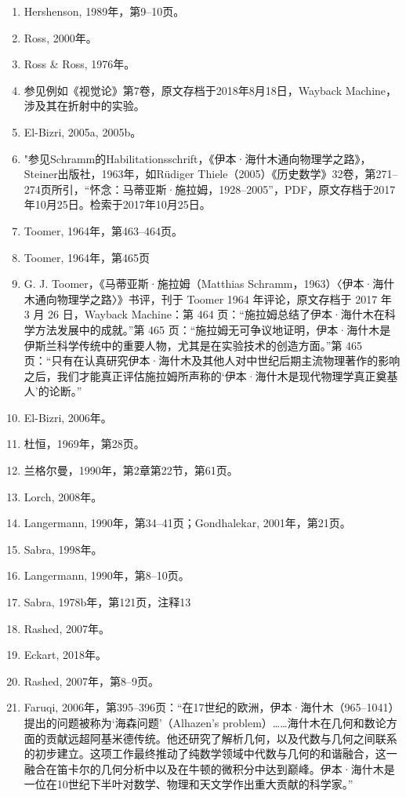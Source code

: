 \begin{enumerate}
\item Hershenson, 1989年，第9–10页。
\item Ross, 2000年。
\item Ross & Ross, 1976年。
\item 参见例如《视觉论》第7卷，原文存档于2018年8月18日，Wayback Machine，涉及其在折射中的实验。
\item El-Bizri, 2005a, 2005b。
\item "参见Schramm的Habilitationsschrift，《伊本·海什木通向物理学之路》，Steiner出版社，1963年，如Rüdiger Thiele（2005）《历史数学》32卷，第271–274页所引，“怀念：马蒂亚斯·施拉姆，1928–2005”，PDF，原文存档于2017年10月25日。检索于2017年10月25日。
\item Toomer, 1964年，第463–464页。
\item Toomer, 1964年，第465页
\item G. J. Toomer，《马蒂亚斯·施拉姆（Matthias Schramm，1963）〈伊本·海什木通向物理学之路〉》书评，刊于 Toomer 1964 年评论，原文存档于 2017 年 3 月 26 日，Wayback Machine：第 464 页：“施拉姆总结了伊本·海什木在科学方法发展中的成就。”第 465 页：“施拉姆无可争议地证明，伊本·海什木是伊斯兰科学传统中的重要人物，尤其是在实验技术的创造方面。”第 465 页：“只有在认真研究伊本·海什木及其他人对中世纪后期主流物理著作的影响之后，我们才能真正评估施拉姆所声称的‘伊本·海什木是现代物理学真正奠基人’的论断。”
\item El-Bizri, 2006年。
\item 杜恒，1969年，第28页。
\item 兰格尔曼，1990年，第2章第22节，第61页。
\item Lorch, 2008年。
\item Langermann, 1990年，第34–41页；Gondhalekar, 2001年，第21页。
\item Sabra, 1998年。
\item Langermann, 1990年，第8–10页。
\item Sabra, 1978b年，第121页，注释13
\item Rashed, 2007年。
\item Eckart, 2018年。
\item Rashed, 2007年，第8–9页。
\item Faruqi, 2006年，第395–396页：“在17世纪的欧洲，伊本·海什木（965–1041）提出的问题被称为‘海森问题’（Alhazen's problem）……海什木在几何和数论方面的贡献远超阿基米德传统。他还研究了解析几何，以及代数与几何之间联系的初步建立。这项工作最终推动了纯数学领域中代数与几何的和谐融合，这一融合在笛卡尔的几何分析中以及在牛顿的微积分中达到巅峰。伊本·海什木是一位在10世纪下半叶对数学、物理和天文学作出重大贡献的科学家。”

\end{enumerate}

